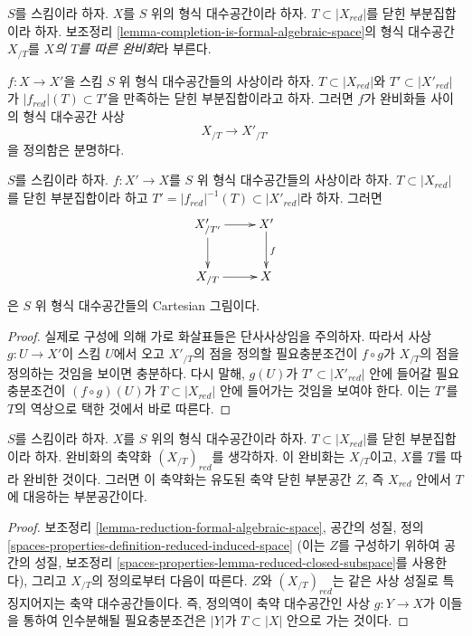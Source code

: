 \begin{definition}
\label{definition-completion-formal-algebraic-space}
$S$를 스킴이라 하자. $X$를 $S$ 위의 형식 대수공간이라 하자.
$T \subset |X_{red}|$를 닫힌 부분집합이라 하자.
보조정리 \ref{lemma-completion-is-formal-algebraic-space}의 형식
대수공간 $X_{/T}$를 {\it $X$의 $T$를 따른 완비화}라 부른다.
\end{definition}

\noindent
$f : X \to X'$을 스킴 $S$ 위 형식 대수공간들의 사상이라 하자.
$T \subset |X_{red}|$와 $T' \subset |X'_{red}|$가
$|f_{red}|(T) \subset T'$을 만족하는 닫힌 부분집합이라고 하자.
그러면 $f$가 완비화들 사이의 형식 대수공간 사상
$$
X_{/T} \longrightarrow X'_{/T'}
$$
을 정의함은 분명하다.

\begin{lemma}
\label{lemma-map-recompletions}
$S$를 스킴이라 하자. $f : X' \to X$를 $S$ 위 형식
대수공간들의 사상이라 하자. $T \subset |X_{red}|$를 닫힌
부분집합이라 하고
$T' = |f_{red}|^{-1}(T) \subset |X'_{red}|$라 하자. 그러면
$$
\xymatrix{
X'_{/T'} \ar[r] \ar[d] & X' \ar[d]^f \\
X_{/T} \ar[r] & X
}
$$
은 $S$ 위 형식 대수공간들의 Cartesian 그림이다.
\end{lemma}

\begin{proof}
실제로 구성에 의해 가로 화살표들은 단사사상임을 주의하자.
따라서 사상
$g : U \to X'$이 스킴 $U$에서 오고 $X'_{/T}$의 점을 정의할
필요충분조건이
$f \circ g$가 $X_{/T}$의 점을 정의하는 것임을 보이면 충분하다.
다시 말해, $g(U)$가 $T' \subset |X'_{red}|$ 안에 들어갈
필요충분조건이 $(f \circ g)(U)$가 $T \subset |X_{red}|$ 안에
들어가는 것임을 보여야 한다. 이는 $T'$를 $T$의 역상으로 택한
것에서 바로 따른다.
\end{proof}

\begin{lemma}
\label{lemma-reduction-recompletion}
$S$를 스킴이라 하자. $X$를 $S$ 위의 형식 대수공간이라 하자.
$T \subset |X_{red}|$를 닫힌 부분집합이라 하자.
완비화의 축약화 $(X_{/T})_{red}$를 생각하자. 이 완비화는
$X_{/T}$이고, $X$를 $T$를 따라 완비한 것이다. 그러면 이 축약화는
유도된 축약 닫힌 부분공간 $Z$, 즉 $X_{red}$ 안에서 $T$에 대응하는
부분공간이다.
\end{lemma}

\begin{proof}
보조정리 \ref{lemma-reduction-formal-algebraic-space}, 공간의 성질,
정의 \ref{spaces-properties-definition-reduced-induced-space}
(이는 $Z$를 구성하기 위하여 공간의 성질, 보조정리
\ref{spaces-properties-lemma-reduced-closed-subspace}를 사용한다),
그리고 $X_{/T}$의 정의로부터 다음이 따른다. $Z$와
$(X_{/T})_{red}$는 같은 사상 성질로 특징지어지는 축약
대수공간들이다. %
즉, 정의역이 축약 대수공간인 사상 $g : Y \to X$가 이들을 통하여
인수분해될 필요충분조건은 $|Y|$가 $T \subset |X|$ 안으로
가는 것이다.
\end{proof}

